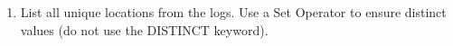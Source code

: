 \documentclass[12pt,a4paper]{article}
\begin{document}
\begin{enumerate}





\item List all unique locations from the logs. Use a Set Operator to ensure distinct values (do not use the DISTINCT keyword).



\end{enumerate}
\end{document}
